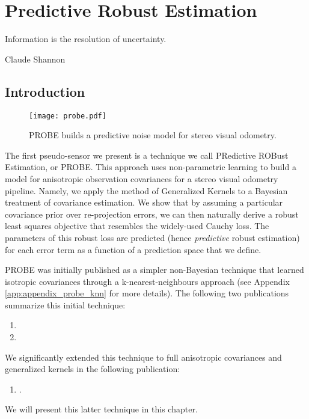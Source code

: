 \chapter{Predictive Robust Estimation}
\label{ch:probe}
\epigraph{Information is the resolution of uncertainty.}{Claude Shannon}

\section{Introduction}

\begin{figure*}[h!]
\centering
\texttt{[image: probe.pdf]}
 \caption{PROBE builds a predictive noise model for stereo visual odometry.}
 \label{fig:probe_intro_fig}
\end{figure*}

The first pseudo-sensor we present is a technique we call PRedictive ROBust Estimation, or PROBE. This approach uses non-parametric learning to build a model for anisotropic observation covariances for a stereo visual odometry pipeline. Namely, we apply the method of Generalized Kernels to a Bayesian treatment of covariance estimation. We show that by assuming a particular covariance prior over re-projection errors, we can then naturally derive a robust least squares objective that resembles the widely-used Cauchy loss. The parameters of this robust loss are predicted (hence \textit{predictive} robust estimation) for each error term as a function of a prediction space that we define.

PROBE was initially published as a simpler non-Bayesian technique that learned isotropic covariances through a k-nearest-neighbours approach (see Appendix \ref{app:appendix_probe_knn} for more details).  The following two publications summarize this initial technique:
\begin{enumerate}
\item {}
\item {}
\end{enumerate}

We significantly extended this technique to full anisotropic covariances and generalized kernels in the following publication:
\begin{enumerate}
\item {}	.
\end{enumerate}

We will present this latter technique in this chapter.

